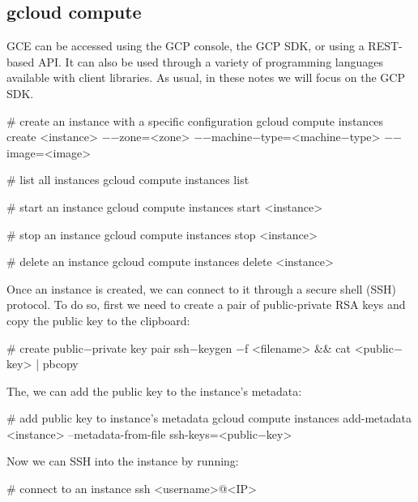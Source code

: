 \subsection{gcloud compute}

GCE can be accessed using the GCP console, the GCP SDK, or using a REST-based API. It can also be used through a variety
of programming languages available with client libraries. As usual, in these notes we will focus on the GCP SDK\@.

\begin{bash}
# create an instance with a specific configuration
gcloud compute instances create <instance> $-$$-$zone=<zone> $-$$-$machine$-$type=<machine$-$type> $-$$-$image=<image>
\end{bash}

\begin{bash}
# list all instances
gcloud compute instances list
\end{bash}

\begin{bash}
# start an instance
gcloud compute instances start <instance>
\end{bash}

\begin{bash}
# stop an instance
gcloud compute instances stop <instance>
\end{bash}

\begin{bash}
# delete an instance
gcloud compute instances delete <instance>
\end{bash}

Once an instance is created, we can connect to it through a secure shell (SSH) protocol. To do so, first we need to
create a pair of public-private RSA keys and copy the public key to the clipboard:
\begin{bash}
# create public$-$private key pair
ssh$-$keygen $-$f <filename> && cat <public$-$key> | pbcopy
\end{bash}

The, we can add the public key to the instance's metadata:
\begin{bash}
# add public key to instance's metadata
gcloud compute instances add-metadata <instance> --metadata-from-file ssh-keys=<public$-$key>
\end{bash}

Now we can SSH into the instance by running:
\begin{bash}
# connect to an instance
ssh <username>@<IP>
\end{bash}

